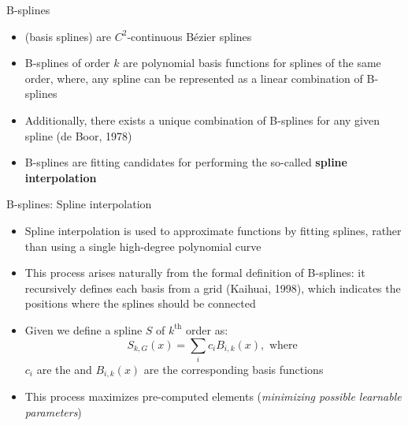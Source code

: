 \begin{frame}{B-splines}
    \begin{itemize}
        \item {} (basis splines) are $C^2$-continuous B\'ezier splines \vspace{0.5em}
        \item B-splines of order $k$ are polynomial basis functions for splines of the same order, where, any spline can be represented as a linear combination of B-splines  \vspace{0.5em}
        \item Additionally, there exists a unique combination of B-splines for any given spline \textcolor{citations}{(de Boor, 1978)} \vspace{0.5em}
        \item B-splines are fitting candidates for performing the so-called \textbf{spline interpolation} \vspace{0.2em}
        \end{itemize}
\end{frame}

\begin{frame}{B-splines: Spline interpolation}
    \begin{itemize}
        \item Spline interpolation is used to approximate functions by fitting splines, rather than using a single high-degree polynomial curve \vspace{0.2em}
        \item This process arises naturally from the formal definition of B-splines: it recursively defines each basis from a grid \textcolor{citations}{(Kaihuai, 1998)},
        which indicates the positions where the splines should be connected \vspace{0.2em}
        \item Given  we define a spline $S$ of $k^{\text{th}}$ order as:
            $$S_{k,G}(x) = \sum_i c_i B_{i,k}(x), \text{ where } $$
          $c_i$ are the  and $B_{i,k}(x)$ are the corresponding basis functions \vspace{0.2em}
          
        \item This process maximizes pre-computed elements (\textit{minimizing possible learnable parameters})
    \end{itemize}
\end{frame}

